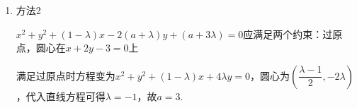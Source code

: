 \begin{enumerate}
\begin{enumerate}
\begin{jieda}
\begin{enumerate}
                    半径$r = \dfrac{1}{2}\sqrt{(1-\lambda)^2+4(a+\lambda)^2-4(a+3\lambda)} = \dfrac{1}{2}\sqrt{5\lambda^2+(8a-14)\lambda + (4a^2-4a+1)}$，当$\lambda = \dfrac{7-4a}{5}$时，半径取得最小值，即以$A, B$为直径的圆，又因为该圆过原点，所以有$a + 3\lambda = 0$，两式联立$\left\{\begin{array}{l}
                    \lambda = \dfrac{7-4a}{5}  \\
                    a + 3\lambda = 0
                \end{array}\right.$，解得$\left\{\begin{array}{l}
                    \lambda = -1  \\
                    a = 3
                \end{array}\right.$.
                \item 方法2
                
                $x^2+y^2+(1-\lambda)x-2(a+\lambda)y+(a+3\lambda) = 0$应满足两个约束：过原点，圆心在$x + {2y} - 3 = 0$上

                满足过原点时方程变为$x^2+y^2+(1-\lambda)x+4\lambda y = 0$，圆心为$\left(\dfrac{\lambda-1}{2}, -2\lambda\right)$，代入直线方程可得$\lambda = -1$，故$a=3$.
            \end{enumerate}
            

\end{jieda}
\end{enumerate}
\end{enumerate}
